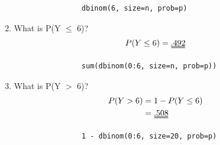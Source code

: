 \documentclass[letterpaper,12pt]{article}
\begin{document}
\begin{enumerate}[label=(\alph*)]
\begin{center}
\begin{lstlisting}
                dbinom(6, size=n, prob=p)
            \end{lstlisting}
        \end{center}
    \item{What is P(Y $\leq$ 6)?}
        \begin{align*}
            P(Y \leq 6) = \uuline{.492}
        \end{align*}
        \begin{center}
            \begin{lstlisting}
                sum(dbinom(0:6, size=n, prob=p))
            \end{lstlisting}
        \end{center}
    \item{What is P(Y $>$ 6)?}
        \begin{align*}
            P(Y > 6) & = 1 - P(Y \leq 6) \\
            & = \uuline{.508}
        \end{align*}
        \begin{center}
            \begin{lstlisting}
                1 - dbinom(0:6, size=20, prob=p)
            \end{lstlisting}
        \end{center}
\end{enumerate}
\end{document}
